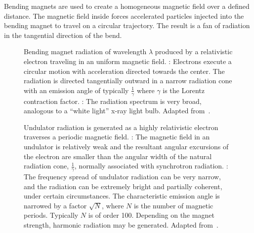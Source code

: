 Bending magnets are used to create a homogeneous magnetic field over a defined distance. The magnetic field inside forces accelerated particles injected into the bending magnet to travel on a circular trajectory. The result is a fan of radiation in the tangential direction of the bend.

\begin{figure}
	\noindent{}
	\caption[Bending magnet radiation]{Bending magnet radiation of wavelength $\lambda$ produced by a relativistic electron traveling in an uniform magnetic field. %
		: Electrons execute a circular motion with acceleration directed towards the center. The radiation is directed tangentially outward in a narrow radiation cone with an emission angle of typically $\frac{1}{\gamma}$ where $\gamma$ is the Lorentz contraction factor. %
		: The radiation spectrum is very broad, analogous to a ``white light'' x-ray light bulb.%
		Adapted from~\cite{Attwood2007}.}%
	\label{fig:bending magnets}
\end{figure}

\begin{figure}
	\noindent{}
	\caption[Undulator radiation]{Undulator radiation is generated as a highly relativistic electron traverses a periodic magnetic field.%
		: The magnetic field in an undulator is relatively weak and the resultant angular excursions of the electron are smaller than the angular width of the natural radiation cone, $\frac{1}{\gamma}$, normally associated with synchrotron radiation.%
		: The frequency spread of undulator radiation can be very narrow, and the radiation can be extremely bright and partially coherent, under certain circumstances. The characteristic emission angle is narrowed by a factor $\sqrt N$, where $N$ is the number of magnetic periods. Typically $N$ is of order 100. Depending on the magnet strength, harmonic radiation may be generated. Adapted from~\cite{Attwood2007}.}%
	\label{fig:undulator}
\end{figure}

